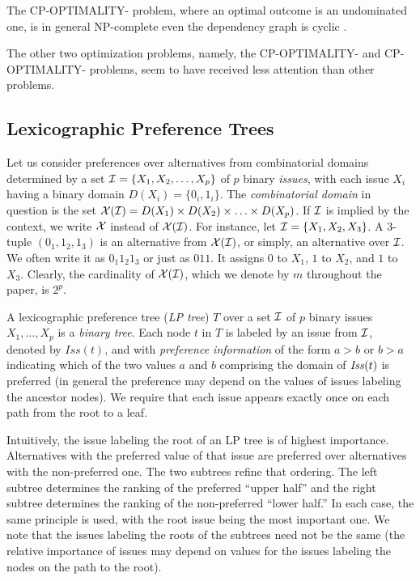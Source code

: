 The CP-OPTIMALITY- problem, where an optimal outcome
is an undominated one, is in general NP-complete even the 
dependency graph is cyclic \cite{Domshlak}.

The other two optimization problems, namely, the CP-OPTIMALITY-
and CP-OPTIMALITY- problems, seem to have received 
less attention than other problems.



\subsection{Lexicographic Preference Trees \label{sec:LPT}}
Let us consider preferences over alternatives from combinatorial domains 
determined by a set $\mathcal{I} = \{X_1, X_2, \ldots, X_p\}$ of $p$ binary 
\emph{issues}, with each issue
$X_i$ having a binary domain $D(X_i) = \{0_i, 1_i\}$. The 
\emph{combinatorial domain} in question is the set $\mathcal{X}(\mathcal{I})=D(X_1) \times 
D(X_2) \times \ldots\times D(X_p)$. If $\mathcal{I}$ is implied by the context, 
we write $\mathcal{X}$ instead of $\mathcal{X}(\mathcal{I})$. For instance, let $\mathcal{I} = \{X_1, X_2, 
X_3\}$. A 3-tuple $(0_1,1_2,1_3)$ is an alternative from $\mathcal{X}(\mathcal{I})$,
or simply, an alternative over $\mathcal{I}$. We 
often write it as $0_1 1_2 1_3$ or just as $011$. It assigns $0$ to 
$X_1$, $1$ to $X_2$, and $1$ to $X_3$.  
Clearly, the cardinality of 
$\mathcal{X}(\mathcal{I})$, which we denote by $m$ throughout the paper, is $2^p$. 

A lexicographic preference tree (\emph{LP tree}) $T$ over a set $\mathcal{I}$ 
of $p$ binary issues $X_1,\ldots,X_p$ is a \emph{binary tree}. Each
node $t$ in $T$ is labeled by an issue from $\mathcal{I}$, denoted by 
$\mathit{Iss}(t)$, and with \emph{preference information} of the form
$a>b$ or $b>a$ indicating which of the two values $a$ and $b$  comprising
the domain of $\mathit{Iss}(t)$ is preferred (in general the preference may depend
on the values of issues labeling the ancestor nodes). We require that 
each issue appears exactly once on each path from the root to a leaf. 

Intuitively, the issue labeling the root of an LP tree is of highest 
importance. Alternatives with the preferred value of that issue
are preferred over alternatives with the non-preferred one. The two
subtrees refine that ordering. The left subtree determines the ranking
of the preferred ``upper half'' and the right subtree determines the 
ranking of the non-preferred ``lower half.'' In each case, the same 
principle is used, with the root issue being the most important one. 
We note that the issues labeling the roots of the 
subtrees need not be the same (the relative importance of issues may 
depend on values for the issues labeling the nodes on the path to the root).

